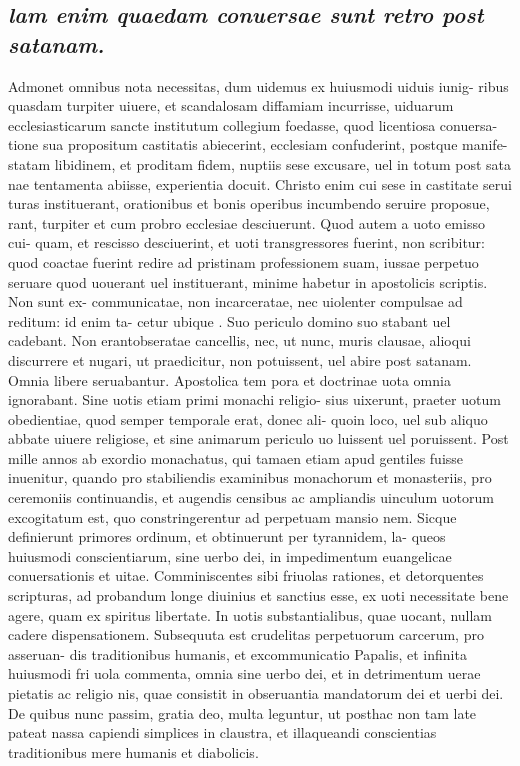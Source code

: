 \documentclass{article}
\begin{document}
\begin{pages}
\subsection*{\textit{lam enim quaedam conuersae sunt retro post satanam. }}\pstart Admonet omnibus nota necessitas, dum uidemus ex huiusmodi uiduis iunig- ribus quasdam turpiter uiuere, et scandalosam diffamiam incurrisse, uiduarum ecclesiasticarum sancte institutum collegium foedasse, quod licentiosa conuersa- tione sua propositum castitatis abiecerint, ecclesiam confuderint, postque manife- statam libidinem, et proditam fidem, nuptiis sese excusare, uel in totum post sata nae tentamenta abiisse, experientia docuit. Christo enim cui sese in castitate serui turas instituerant, orationibus et bonis operibus incumbendo seruire proposue, rant, turpiter et cum probro ecclesiae desciuerunt. Quod autem a uoto emisso cui- quam, et rescisso desciuerint, et uoti transgressores fuerint, non scribitur: quod coactae fuerint redire ad pristinam professionem suam, iussae perpetuo seruare quod uouerant uel instituerant, minime habetur in apostolicis scriptis. Non sunt ex- communicatae, non incarceratae, nec uiolenter compulsae ad reditum: id enim ta- cetur ubique . Suo periculo domino suo stabant uel cadebant. Non erantobseratae cancellis, nec, ut nunc, muris clausae, alioqui discurrere et nugari, ut praedicitur, non potuissent, uel abire post satanam. Omnia libere seruabantur. Apostolica tem pora et doctrinae uota omnia ignorabant. Sine uotis etiam primi monachi religio- sius uixerunt, praeter uotum obedientiae, quod semper temporale erat, donec ali- quoin loco, uel sub aliquo abbate uiuere religiose, et sine animarum periculo uo luissent uel poruissent. Post mille annos ab exordio monachatus, qui tamaen etiam apud gentiles fuisse inuenitur, quando pro stabiliendis examinibus monachorum et monasteriis, pro ceremoniis continuandis, et augendis censibus ac ampliandis uinculum uotorum excogitatum est, quo constringerentur ad perpetuam mansio nem. Sicque definierunt primores ordinum, et obtinuerunt per tyrannidem, la- queos huiusmodi conscientiarum, sine uerbo dei, in impedimentum euangelicae conuersationis et uitae. Comminiscentes sibi friuolas rationes, et detorquentes scripturas, ad probandum longe diuinius et sanctius esse, ex uoti necessitate bene agere, quam ex spiritus libertate. In uotis substantialibus, quae uocant, nullam cadere dispensationem. Subsequuta est crudelitas perpetuorum carcerum, pro asseruan- dis traditionibus humanis, et excommunicatio Papalis, et infinita huiusmodi fri uola commenta, omnia sine uerbo dei, et in detrimentum uerae pietatis ac religio nis, quae consistit in obseruantia mandatorum dei et uerbi dei. De quibus nunc passim, gratia deo, multa leguntur, ut posthac non tam late pateat nassa capiendi simplices in claustra, et illaqueandi conscientias traditionibus mere humanis et diabolicis.  \pend
{}
{}

\end{pages}
\end{document}
